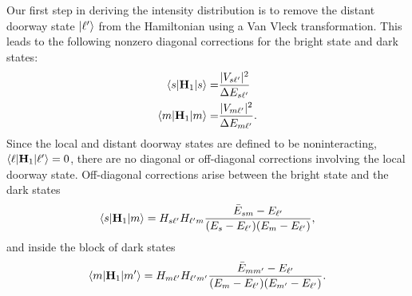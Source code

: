 Our first step in deriving the intensity distribution is to remove the
distant doorway state $\mathinner{|{\ell'}\rangle}$ from the Hamiltonian using a Van Vleck
transformation.  This leads to the following nonzero diagonal
corrections for the bright state and dark states:
\begin{align}
  \mathinner{\langle{s|\mathbf{H}_1|s}\rangle} =&
    \frac{\lvert V_{s\ell'} \rvert^2}{\Delta E_{s\ell'}}\\
  \mathinner{\langle{m|\mathbf{H}_1|m}\rangle} =&
    \frac{\lvert V_{m\ell'} \rvert^2}{\Delta E_{m\ell'}}.
\end{align}
Since the local and distant doorway states are defined to be
noninteracting, $\mathinner{\langle{\ell|\mathbf{H}_1|\ell'}\rangle} = 0$, there are no
diagonal or off-diagonal corrections involving the local doorway
state.  Off-diagonal corrections arise between the bright state and
the dark states
\begin{equation}
  \mathinner{\langle{s|\mathbf{H}_1|m}\rangle} = H_{s\ell'} H_{\ell' m}
    \frac{\bar{E}_{sm} - E_{\ell'}}{(E_s - E_{\ell'})(E_m - E_{\ell'})},
\end{equation}
and inside the block of dark states
\begin{equation}
  \mathinner{\langle{m|\mathbf{H}_1|m'}\rangle} = H_{m \ell'} H_{\ell' m'}
    \frac{\bar{E}_{mm'} - E_{\ell'}}{(E_m - E_{\ell'})(E_{m'} - E_{\ell'})}.
\end{equation}

